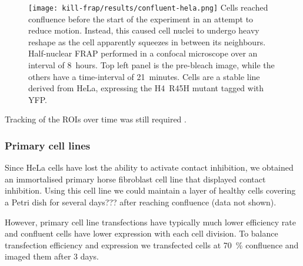       \begin{figure}
        \centering
        \texttt{[image: kill-frap/results/confluent-hela.png]}
          {
            Cells reached confluence before the start of the
            experiment in an attempt to reduce motion. Instead, this caused
            cell nuclei to undergo heavy reshape as the cell apparently
            squeezes in between its neighbours. Half-nuclear FRAP performed in
            a confocal microscope over an interval of 8~hours. Top left panel
            is the pre-bleach image, while the others have a time-interval of
            21~minutes. Cells are a stable line derived from HeLa, expressing
            the H4~R45H mutant tagged with YFP.
          }
        \label{fig:kill-frap:confluent-hela}
      \end{figure}

      Tracking of the ROIs over time was still required .

    \subsubsection{Primary cell lines}

      Since HeLa cells have lost the ability to activate contact inhibition, 
	  we obtained an immortalised primary horse fibroblast cell line 
	  that displayed contact inhibition. Using this cell line we could 
	  maintain a layer of healthy cells covering a Petri dish for several days??? 
	  after reaching confluence (data not shown).

      However, primary cell line transfections have typically much lower efficiency rate and 
	  confluent cells have lower expression with each cell division.
	  To balance transfection efficiency and expression we transfected cells at 
	  \SI{70}{\percent} confluence and imaged them after 3 days.

